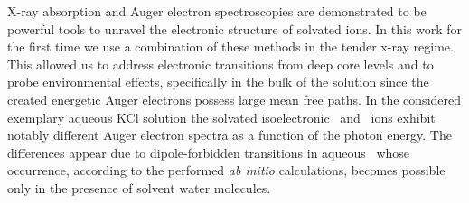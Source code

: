 X-ray absorption and Auger electron spectroscopies are demonstrated to be powerful tools to unravel the electronic structure of solvated ions. In this work for the first time we use a combination of these methods in the tender x-ray regime. This allowed us to address electronic transitions from deep core levels and to probe environmental effects, specifically in the bulk of the solution since the created energetic Auger electrons possess large mean free paths. In the considered exemplary aqueous KCl solution the solvated isoelectronic \ki~and \cli~ions exhibit notably different Auger electron spectra as a function of the photon energy. The differences appear due to dipole-forbidden transitions in aqueous \ki~whose occurrence, according to the performed {\it ab initio} calculations, becomes possible only in the presence of solvent water molecules.